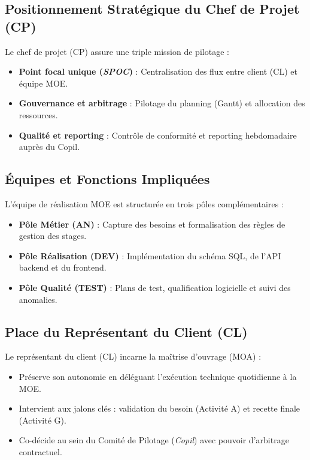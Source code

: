 \documentclass[a4paper,12pt]{report}
\begin{document}
	\subsection{Positionnement Stratégique du Chef de Projet (CP)}
	Le chef de projet (CP) assure une triple mission de pilotage :
	\begin{itemize}[leftmargin=1.0cm, noitemsep, topsep=0pt]
		\item \textbf{Point focal unique (\textit{SPOC})} : Centralisation des flux entre client (CL) et équipe MOE.
		\item \textbf{Gouvernance et arbitrage} : Pilotage du planning (Gantt) et allocation des ressources.
		\item \textbf{Qualité et reporting} : Contrôle de conformité et reporting hebdomadaire auprès du Copil.
	\end{itemize}
	
	\subsection{Équipes et Fonctions Impliquées}
	L'équipe de réalisation MOE est structurée en trois pôles complémentaires :
	\begin{itemize}[leftmargin=1.0cm, noitemsep, topsep=0pt]
		\item \textbf{Pôle Métier (AN)} : Capture des besoins et formalisation des règles de gestion des stages.
		\item \textbf{Pôle Réalisation (DEV)} : Implémentation du schéma SQL, de l'API backend et du frontend.
		\item \textbf{Pôle Qualité (TEST)} : Plans de test, qualification logicielle et suivi des anomalies.
	\end{itemize}
	
	\subsection{Place du Représentant du Client (CL)}
	Le représentant du client (CL) incarne la maîtrise d'ouvrage (MOA) :
	\begin{itemize}[leftmargin=1.0cm, noitemsep, topsep=0pt]
		\item Préserve son autonomie en déléguant l'exécution technique quotidienne à la MOE.
		\item Intervient aux jalons clés : validation du besoin (Activité A) et recette finale (Activité G).
		\item Co-décide au sein du Comité de Pilotage (\textit{Copil}) avec pouvoir d'arbitrage contractuel.
	\end{itemize}
	
\end{document}
